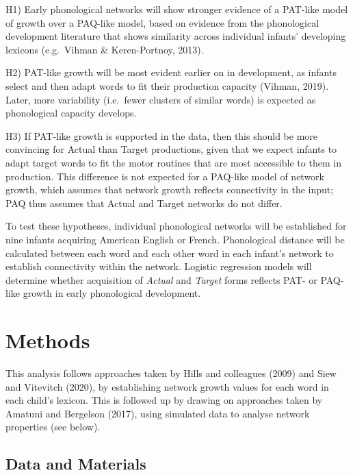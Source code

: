 \documentclass[
  english,
  man,floatsintext]{apa6}
\begin{document}
H1) Early phonological networks will show stronger evidence of a PAT-like model of growth over a PAQ-like model, based on evidence from the phonological development literature that shows similarity across individual infants' developing lexicons (e.g.~Vihman \& Keren-Portnoy, 2013).

H2) PAT-like growth will be most evident earlier on in development, as infants select and then adapt words to fit their production capacity (Vihman, 2019). Later, more variability (i.e.~fewer clusters of similar words) is expected as phonological capacity develops.

H3) If PAT-like growth is supported in the data, then this should be more convincing for Actual than Target productions, given that we expect infants to adapt target words to fit the motor routines that are most accessible to them in production. This difference is not expected for a PAQ-like model of network growth, which assumes that network growth reflects connectivity in the input; PAQ thus assumes that Actual and Target networks do not differ.

To test these hypotheses, individual phonological networks will be established for nine infants acquiring American English or French. Phonological distance will be calculated between each word and each other word in each infant's network to establish connectivity within the network. Logistic regression models will determine whether acquisition of \emph{Actual} and \emph{Target} forms reflects PAT- or PAQ-like growth in early phonological development.

\hypertarget{methods}{%
\section{Methods}\label{methods}}

This analysis follows approaches taken by Hills and colleagues (2009) and Siew and Vitevitch (2020), by establishing network growth values for each word in each child's lexicon. This is followed up by drawing on approaches taken by Amatuni and Bergelson (2017), using simulated data to analyse network properties (see below).

\hypertarget{data-and-materials}{%
\subsection{Data and Materials}\label{data-and-materials}}
\end{document}
